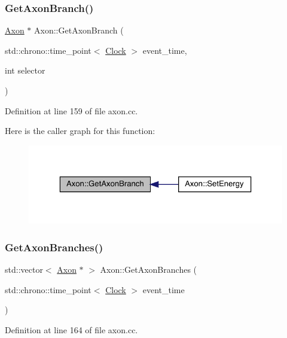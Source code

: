 \subsubsection{\texorpdfstring{Get\+Axon\+Branch()}{GetAxonBranch()}}
{\footnotesize\ttfamily \hyperlink{class_axon}{Axon} $\ast$ Axon\+::\+Get\+Axon\+Branch (\begin{DoxyParamCaption}\item[{std\+::chrono\+::time\+\_\+point$<$ \hyperlink{universe_8h_a0ef8d951d1ca5ab3cfaf7ab4c7a6fd80}{Clock} $>$}]{event\+\_\+time,  }\item[{int}]{selector }\end{DoxyParamCaption})}



Definition at line 159 of file axon.\+cc.

Here is the caller graph for this function\+:
\nopagebreak
\begin{figure}[H]
\begin{center}
\leavevmode
\includegraphics[width=323pt]{class_axon_a723b00504169712e47f7437111ad4ae3_icgraph}
\end{center}
\end{figure}
\mbox{\label{class_axon_adf5796ef2f72ce56516b37e7e09e9d6c}} 
\subsubsection{\texorpdfstring{Get\+Axon\+Branches()}{GetAxonBranches()}}
{\footnotesize\ttfamily std\+::vector$<$ \hyperlink{class_axon}{Axon} $\ast$ $>$ Axon\+::\+Get\+Axon\+Branches (\begin{DoxyParamCaption}\item[{std\+::chrono\+::time\+\_\+point$<$ \hyperlink{universe_8h_a0ef8d951d1ca5ab3cfaf7ab4c7a6fd80}{Clock} $>$}]{event\+\_\+time }\end{DoxyParamCaption})}



Definition at line 164 of file axon.\+cc.

